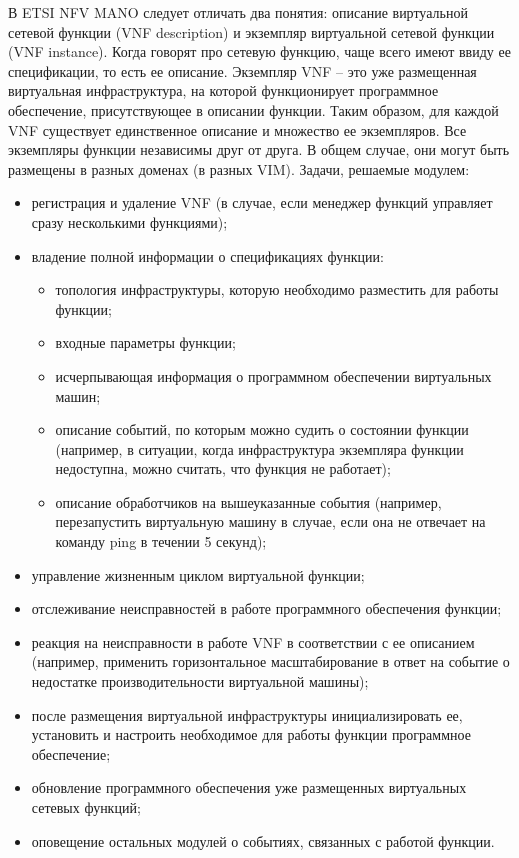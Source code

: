 \documentclass[oneside,final,14pt,a4paper]{extreport}
\begin{document}
В ETSI NFV MANO следует отличать два понятия: описание виртуальной сетевой функции (VNF description) и экземпляр виртуальной сетевой функции (VNF instance). Когда говорят про сетевую функцию, чаще всего имеют ввиду ее спецификации, то есть ее описание. Экземпляр VNF -- это уже размещенная виртуальная инфраструктура, на которой функционирует программное обеспечение, присутствующее в описании функции. Таким образом, для каждой VNF существует единственное описание и множество ее экземпляров. Все экземпляры функции независимы друг от друга. В общем случае, они могут быть размещены в разных доменах (в разных VIM). Задачи, решаемые модулем:

\begin{itemize}
	\item регистрация и удаление VNF (в случае, если менеджер функций управляет сразу несколькими функциями);
	\item владение полной информации о спецификациях функции:
	\begin{itemize}
		\item топология инфраструктуры, которую необходимо разместить для работы функции;
		\item входные параметры функции;
		\item исчерпывающая информация о программном обеспечении виртуальных машин;
		\item описание событий, по которым можно судить о состоянии функции (например, в ситуации, когда инфраструктура экземпляра функции недоступна, можно считать, что функция не работает);
		\item описание обработчиков на вышеуказанные события (например, перезапустить виртуальную машину в случае, если она не отвечает на команду ping в течении 5 секунд);
	\end{itemize}
	\item управление жизненным циклом виртуальной функции;
	\item отслеживание неисправностей в работе программного обеспечения функции;
	\item реакция на неисправности в работе VNF в соответствии с ее описанием (например, применить горизонтальное масштабирование в ответ на событие о недостатке производительности виртуальной машины);
	\item после размещения виртуальной инфраструктуры инициализировать ее, установить и настроить необходимое для работы функции программное обеспечение;
	\item обновление программного обеспечения уже размещенных виртуальных сетевых функций;
	\item оповещение остальных модулей о событиях, связанных с работой функции.
\end{itemize}
\end{document}
